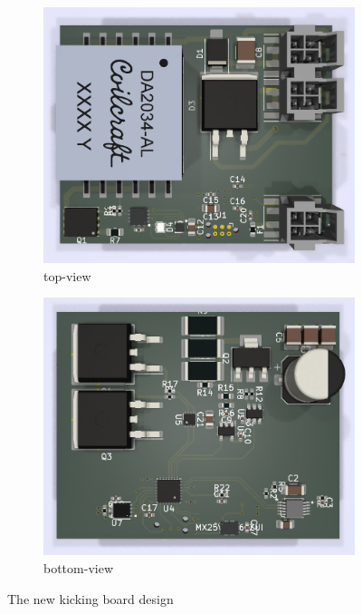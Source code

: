 \documentclass[runningheads]{llncs}
\begin{document}
\begin{figure}
	\centering
    \begin{subfigure}[b]{0.45\textwidth}
         \centering
         \includegraphics[width=\textwidth]{images/mikona_top.png}
         \caption{top-view}
         \label{fig:mikona_top}
    \end{subfigure}
    \hfill
    \begin{subfigure}[b]{0.45\textwidth}
        \centering
        \includegraphics[width=\textwidth]{images/mikona_bottom.png}
        \caption{bottom-view}
        \label{fig:mikona_bottom}
    \end{subfigure}

    \caption{The new kicking board design}
    \label{fig:mikona}
\end{figure}
\end{document}
